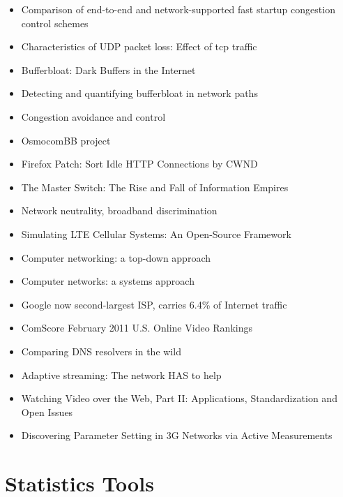 \begin{itemize}
\item Comparison of end-to-end and network-supported fast startup congestion control schemes \cite{scharf2011comparison}
\item Characteristics of UDP packet loss: Effect of tcp traffic \cite{sawashima97characteristics}
\item Bufferbloat: Dark Buffers in the Internet \cite{gettys2011bufferbloat}
\item Detecting and quantifying bufferbloat in network paths \cite{groenewegen2011detecting}
\item Congestion avoidance and control \cite{jacobson1988congestion}
\item OsmocomBB project \cite{osmocombbwww}
\item Firefox Patch: Sort Idle HTTP Connections by CWND \cite{ffSortCWND}


\item The Master Switch: The Rise and Fall of Information Empires \cite{wu2010master}
\item Network neutrality, broadband discrimination \cite{wu2003network}
\item Simulating LTE Cellular Systems: An Open-Source Framework \cite{5634134}
\item Computer networking: a top-down approach \cite{kurose2008computer}
\item Computer networks: a systems approach \cite{peterson2007computer}
\item Google now second-largest ISP, carries 6.4\% of Internet traffic \cite{nw2010carrier}
\item ComScore February 2011 U.S. Online Video Rankings \cite{comscore2011ranking}
\item Comparing DNS resolvers in the wild \cite{ager2010comparing}
\item Adaptive streaming: The network HAS to help \cite{BLTJ:BLTJ20505}
\item Watching Video over the Web, Part II: Applications, Standardization and Open Issues \cite{watching-video2}
\item Discovering Parameter Setting in 3G Networks via Active Measurements \cite{4640935}
\end{itemize}

\section{Statistics Tools}

